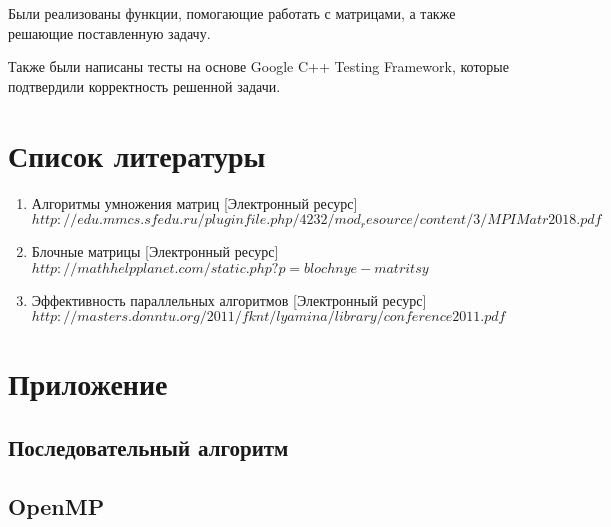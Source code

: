 \documentclass{report}
\begin{document}
Были реализованы функции, помогающие работать с матрицами, а также решающие поставленную задачу.

Также были написаны тесты на основе Google C++ Testing Framework, которые подтвердили корректность решенной задачи.
\newpage

\section{\hspace{0.6cm}Список литературы}
\begin{enumerate}
\item Алгоритмы умножения матриц [Электронный ресурс]\\$http://edu.mmcs.sfedu.ru/pluginfile.php/4232/mod_resource/content/3/MPIMatr2018.pdf$\\
\item Блочные матрицы [Электронный ресурс]\\$http://mathhelpplanet.com/static.php?p=blochnye-matritsy$\\
\item Эффективность параллельных алгоритмов [Электронный ресурс] \\$http://masters.donntu.org/2011/fknt/lyamina/library/conference2011.pdf$
\end{enumerate}

\newpage

\section{\hspace{0.6cm}Приложение}
\subsection{Последовательный алгоритм}




\subsection{OpenMP}



\end{document}

